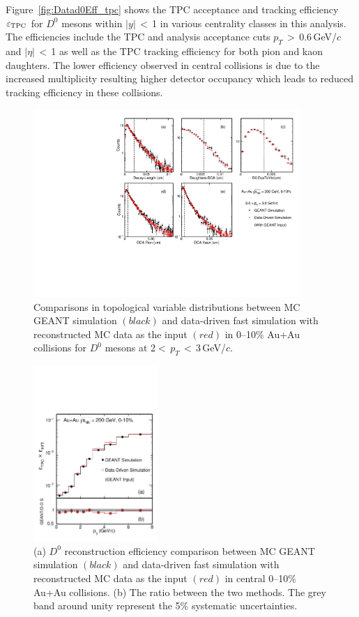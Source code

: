 \documentclass[%
 reprint,	
 amsmath,amssymb,
 aps,
 prc,
]{revtex4-1}
\begin{document}
Figure~\ref{fig:Datad0Eff_tpc} shows the TPC acceptance and tracking efficiency $\varepsilon_{\rm TPC}$ for $D^0$ mesons within $|y|$\,$<$\,1 in various centrality classes in this analysis. The efficiencies include the TPC and analysis acceptance cuts $p_{T}$\,$>$\,0.6\,GeV/$c$ and $|\eta|$\,$<$\,1 as well as the TPC tracking efficiency for both pion and kaon daughters. The lower efficiency observed in central collisions is due to the increased multiplicity resulting higher detector occupancy which leads to reduced tracking efficiency in these collisions.



\begin{figure}
\centering
\includegraphics[width=0.90\textwidth]{fig/McTopo.pdf}
\caption{Comparisons in topological variable distributions between MC GEANT simulation $(black)$ and data-driven fast simulation with reconstructed MC data as the input $(red)$ in 0--10\% Au+Au collisions for $D^0$ mesons at 2$<$\,$p_T$\,$<$\,3\,GeV/$c$.}
\label{fig:McTopo} 
\end{figure}


\begin{figure}
\centering
\includegraphics[width=0.42\textwidth]{fig/Mcd0Eff_0_10.pdf}
  \caption{(a) $D^{0}$ reconstruction efficiency comparison between MC GEANT simulation $(black)$ and data-driven fast simulation with reconstructed MC data as the input $(red)$ in central 0--10\% Au+Au collisions. (b) The ratio between the two methods. The grey band around unity represent the 5\% systematic uncertainties.}
\label{fig:Mcd0Eff_0_10} 
\end{figure}
\end{document}
